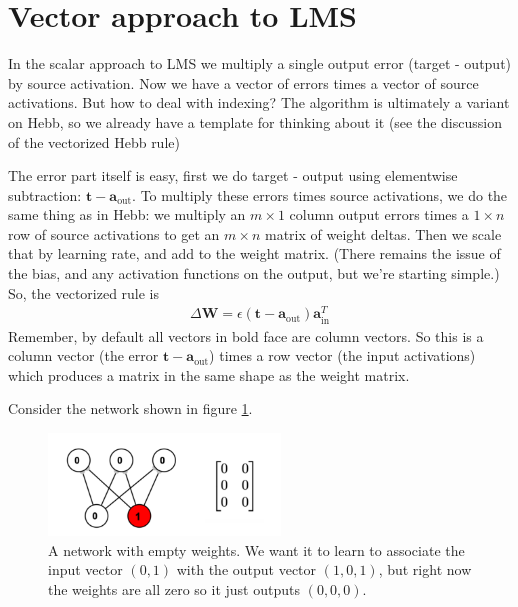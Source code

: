 \section{Vector approach to LMS}

In the scalar approach to LMS we multiply a single output error (target - output) by source activation. Now we have a vector of errors times a vector of source activations. But how to deal with indexing?  The algorithm is ultimately a variant on Hebb, so we already have a template for thinking about it (see the discussion of the vectorized Hebb rule)

The error part itself is easy, first we do target - output using elementwise subtraction: $\mathbf{t} - \mathbf{a}_{\text{out}}$. To multiply these errors times source activations, we do the same thing as in Hebb: we multiply an $m \times  1$ column output errors times a $1 \times  n$ row of source activations to get an $m \times n$ matrix of weight deltas. Then we scale that by learning rate, and add to the weight matrix. (There remains the issue of the bias, and any activation functions on the output, but we're starting simple.) So, the vectorized rule is
\begin{eqnarray}\label{vectorizedLMS}
\Delta \mathbf{W}  =  \epsilon (\mathbf{t} - \mathbf{a}_{\text{out}}) \mathbf{a}_{\text{in}}^T
\end{eqnarray}
Remember, by default all vectors in bold face are column vectors. So this is a column vector (the error $\mathbf{t} - \mathbf{a}_{\text{out}}$) times a row vector (the input activations) which produces a matrix in the same shape as the weight matrix.

Consider the network shown in figure \ref{lms_vector_pre}.

\begin{figure}[h]
\centering
\includegraphics[width=0.55\textwidth]{images/vectorLMSBeforeTrain.png}
\caption[Jeff Yoshimi.]{A network with empty weights. We want it to learn to associate the input vector $(0,1)$ with the output vector $(1,0,1)$, but right now the weights are all zero so it just outputs $(0,0,0)$. }
\label{lms_vector_pre}
\end{figure}

